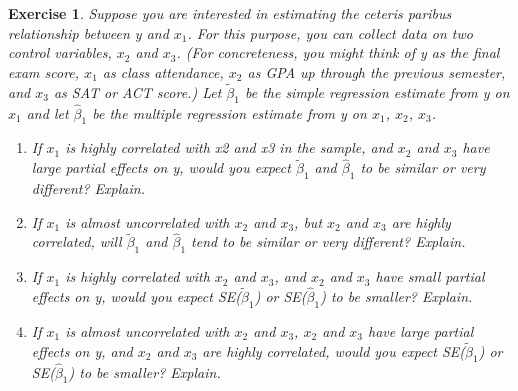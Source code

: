\documentclass{article}
\newtheorem{exercise}[theorem]{Exercise}
\begin{document}
\begin{exercise} %
Suppose you are interested in estimating the ceteris paribus relationship between y and $x_1$. For this purpose, you can collect data on two control variables, $x_2$ and $x_3$. (For concreteness, you might think of y as the final exam score, $x_1$ as class attendance, $x_2$ as GPA up through the previous semester, and $x_3$ as SAT or ACT score.) Let $\tilde{\beta}_1$ be the simple regression estimate from y on $x_1$ and let $\hat{\beta}_1$ be the multiple regression estimate from y on $x_1$, $x_2$, $x_3$.
\begin{enumerate}[label=(\alph*)]
    \item If $x_1$ is highly correlated with x2 and x3 in the sample, and $x_2$ and $x_3$ have large partial effects on y, would you expect $\tilde{\beta}_1$ and $\hat{\beta}_1$ to be similar or very different? Explain.
    \item If $x_1$ is almost uncorrelated with $x_2$ and $x_3$, but $x_2$ and $x_3$ are highly correlated, will $\tilde{\beta}_1$ and $\hat{\beta}_1$ tend to be similar or very different? Explain.
    \item If $x_1$ is highly correlated with $x_2$ and $x_3$, and $x_2$ and $x_3$ have small partial effects on y, would you expect SE($\tilde{\beta}_1$) or SE($\hat{\beta}_1$) to be smaller? Explain.
    \item If $x_1$ is almost uncorrelated with $x_2$ and $x_3$, $x_2$ and $x_3$ have large partial effects on y, and $x_2$ and $x_3$ are highly correlated, would you expect SE($\tilde{\beta}_1$) or SE($\hat{\beta}_1$) to be smaller? Explain.
\end{enumerate}

\end{exercise}
\end{document}
